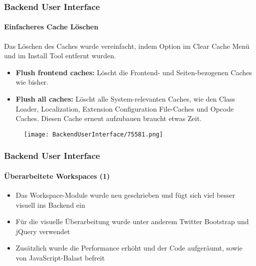 \begin{frame}[fragile]
	\frametitle{Backend User Interface}
	\framesubtitle{Einfacheres Cache Löschen}

	Das Löschen des Caches wurde vereinfacht, indem Option im Clear Cache Menü und im Install Tool entfernt wurden.

	\begin{itemize}

		\item \textbf{Flush frontend caches:}\newline
			\small
				Löscht die Frontend- und Seiten-bezogenen Caches wie bisher.
			\normalsize

		\item \textbf{Flush all caches:}\newline
			\small
				Löscht alle System-relevanten Caches, wie den Class Loader, Localization, Extension Configuration File-Caches und Opcode Caches. Diesen Cache erneut aufzubauen braucht etwas Zeit.
			\normalsize

	\end{itemize}

	\begin{figure}
		\texttt{[image: BackendUserInterface/75581.png]}
	\end{figure}

\end{frame}

\begin{frame}[fragile]
	\frametitle{Backend User Interface}
	\framesubtitle{Überarbeitete Workspaces (1)}

	\begin{itemize}

		\item Das Workspace-Module wurde neu geschrieben und fügt sich viel besser visuell ins Backend ein

		\item Für die visuelle Überarbeitung wurde unter anderem  Twitter Bootstrap und jQuery verwendet

		\item Zusätzlich wurde die Performance erhöht und der Code aufgeräumt, sowie von JavaScript-Balast befreit

	\end{itemize}

\end{frame}

